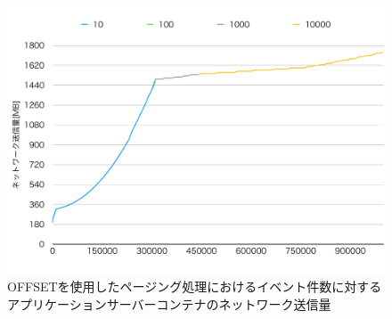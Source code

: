 \documentclass[../../../../../main]{subfiles}
\begin{document}
    \begin{figure}[H]
        \centering
        \includegraphics[width=12cm]{graph}
        \caption{OFFSETを使用したページング処理におけるイベント件数に対するアプリケーションサーバーコンテナのネットワーク送信量}
        \label{fig:paging-offset-app-net-out-app_1_1024-db_1_1024}
    \end{figure}
\end{document}
